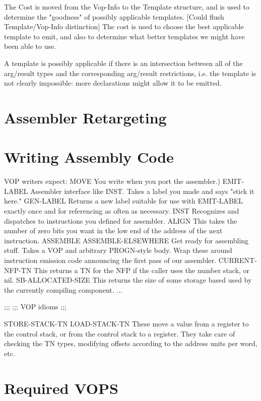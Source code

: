 The Cost is moved from the Vop-Info to the Template structure, and is used to
determine the "goodness" of possibly applicable templates.  [Could flush
Template/Vop-Info distinction]  The cost is used to choose the best applicable
template to emit, and also to determine what better templates we might have
been able to use.

A template is possibly applicable if there is an intersection between all of
the arg/result types and the corresponding arg/result restrictions, i.e. the
template is not clearly impossible: more declarations might allow it to be
emitted.


\chapter{Assembler Retargeting}


\chapter{Writing Assembly Code}

VOP writers expect:
   MOVE
      You write when you port the assembler.)
   EMIT-LABEL
      Assembler interface like INST.  Takes a label you made and says "stick it
      here."
   GEN-LABEL
      Returns a new label suitable for use with EMIT-LABEL exactly once and
      for referencing as often as necessary.
   INST
      Recognizes and dispatches to instructions you defined for assembler.
   ALIGN
      This takes the number of zero bits you want in the low end of the address
      of the next instruction.
   ASSEMBLE
   ASSEMBLE-ELSEWHERE
      Get ready for assembling stuff.  Takes a VOP and arbitrary PROGN-style
      body.  Wrap these around instruction emission code announcing the first
      pass of our assembler.
   CURRENT-NFP-TN
      This returns a TN for the NFP if the caller uses the number stack, or
      nil.
   SB-ALLOCATED-SIZE
      This returns the size of some storage based used by the currently
      compiling component.
   ...

;;;
;;; VOP idioms
;;;

STORE-STACK-TN
LOAD-STACK-TN
   These move a value from a register to the control stack, or from the
   control stack to a register.  They take care of checking the TN types,
   modifying offsets according to the address units per word, etc.


\chapter{Required VOPS}


